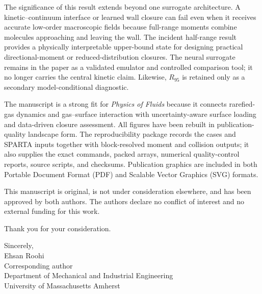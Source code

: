 \documentclass[10pt]{article}
\begin{document}
The significance of this result extends beyond one surrogate architecture. A kinetic--continuum interface or learned wall closure can fail even when it receives accurate low-order macroscopic fields because full-range moments combine molecules approaching and leaving the wall. The incident half-range result provides a physically interpretable upper-bound state for designing practical directional-moment or reduced-distribution closures. The neural surrogate remains in the paper as a validated emulator and controlled comparison tool; it no longer carries the central kinetic claim. Likewise, $R_{95}$ is retained only as a secondary model-conditional diagnostic.

The manuscript is a strong fit for \emph{Physics of Fluids} because it connects rarefied-gas dynamics and gas--surface interaction with uncertainty-aware surface loading and data-driven closure assessment. All figures have been rebuilt in publication-quality landscape form. The reproducibility package records the cases and SPARTA inputs together with block-resolved moment and collision outputs; it also supplies the exact commands, packed arrays, numerical quality-control reports, source scripts, and checksums. Publication graphics are included in both Portable Document Format (PDF) and Scalable Vector Graphics (SVG) formats.

This manuscript is original, is not under consideration elsewhere, and has been approved by both authors. The authors declare no conflict of interest and no external funding for this work.

Thank you for your consideration.

\begin{flushright}
Sincerely,\\[0.55em]
Ehsan Roohi\\
Corresponding author\\
Department of Mechanical and Industrial Engineering\\
University of Massachusetts Amherst
\end{flushright}
\end{document}
